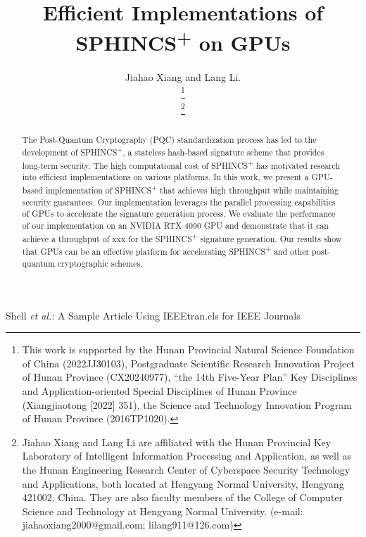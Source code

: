 \documentclass[journal]{IEEEtran}
\begin{document}
\title{Efficient Implementations of SPHINCS\textsuperscript{+} on GPUs}

\author{Jiahao Xiang and Lang Li.

  \thanks{This work is supported by the Hunan Provincial Natural Science Foundation of China (2022JJ30103), Postgraduate Scientific Research Innovation Project of Hunan Province (CX20240977), “the 14th Five-Year Plan” Key Disciplines and Application-oriented Special Disciplines of Hunan Province (Xiangjiaotong [2022] 351), the Science and Technology Innovation Program of Hunan Province (2016TP1020).}

  \thanks{Jiahao Xiang and Lang Li are affiliated with the Hunan Provincial Key Laboratory of Intelligent Information Processing and Application, as well as the Hunan Engineering Research Center of Cyberspace Security Technology and Applications, both located at Hengyang Normal University, Hengyang 421002, China. They are also faculty members of the College of Computer Science and Technology at Hengyang Normal University. (e-mail: jiahaoxiang2000@gmail.com; lilang911@126.com)}%
}

%
{Shell \MakeLowercase{\textit{et al.}}: A Sample Article Using IEEEtran.cls for IEEE Journals}

\IEEEpubid{}

\maketitle

\begin{abstract}

    The Post-Quantum Cryptography (PQC) standardization process has led to the development of SPHINCS\textsuperscript{+}, a stateless hash-based signature scheme that provides long-term security. The high computational cost of SPHINCS\textsuperscript{+} has motivated research into efficient implementations on various platforms. In this work, we present a GPU-based implementation of SPHINCS\textsuperscript{+} that achieves high throughput while maintaining security guarantees. Our implementation leverages the parallel processing capabilities of GPUs to accelerate the signature generation process. We evaluate the performance of our implementation on an NVIDIA RTX 4090 GPU and demonstrate that it can achieve a throughput of xxx for the SPHINCS\textsuperscript{+} signature generation. Our results show that GPUs can be an effective platform for accelerating SPHINCS\textsuperscript{+} and other post-quantum cryptographic schemes.

\end{abstract}
\end{document}

